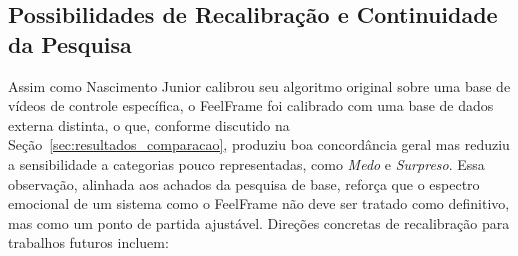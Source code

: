 \documentclass[
	12pt,
	openright,
	oneside,
	a4paper,
	english,
	brazil
	]{abntex2}
\begin{document}
\subsection{Possibilidades de Recalibração e Continuidade da Pesquisa}

Assim como Nascimento Junior \cite{nascimento2024nelson} calibrou seu algoritmo original sobre uma base de vídeos de controle específica, o FeelFrame foi calibrado com uma base de dados externa distinta, o que, conforme discutido na Seção~\ref{sec:resultados_comparacao}, produziu boa concordância geral mas reduziu a sensibilidade a categorias pouco representadas, como \textit{Medo} e \textit{Surpreso}. Essa observação, alinhada aos achados da pesquisa de base, reforça que o espectro emocional de um sistema como o FeelFrame não deve ser tratado como definitivo, mas como um ponto de partida ajustável. Direções concretas de recalibração para trabalhos futuros incluem:
\end{document}
